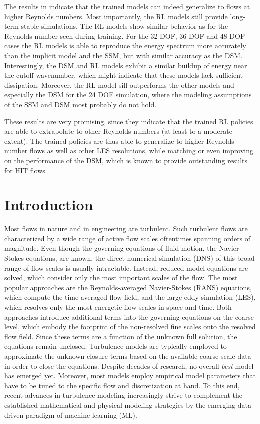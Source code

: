 The results in  indicate that the trained models can indeed generalize to flows at higher Reynolds numbers.
Most importantly, the RL models still provide long-term stable simulations.
The RL models show similar behavior as for the Reynolds number seen during training. 
For the 32 DOF, 36 DOF and 48 DOF cases the RL models is able to reproduce the energy spectrum more accurately than the implicit model and the SSM, but with similar accuracy as the DSM. 
Interestingly, the DSM and RL models exhibit a similar buildup of energy near the cutoff wavenumber, which might indicate that these models lack sufficient dissipation.
Moreover, the RL model sill outperforms the other models and especially the DSM for the 24 DOF simulation, where the modeling assumptions of the SSM and DSM most probably do not hold.

These results are very promising, since they indicate that the trained RL policies are able to extrapolate to other Reynolds numbers (at least to a moderate extent).
The trained policies are thus able to generalize to higher Reynolds number flows as well as other LES resolutions, while matching or even improving on the performance of the DSM, which is known to provide outstanding results for HIT flows.

\section{Introduction}
\label{sec:introduction}


Most flows in nature and in engineering are turbulent.
Such turbulent flows are characterized by a wide range of active flow scales oftentimes spanning orders of magnitude.
Even though the governing equations of fluid motion, the Navier-Stokes equations, are known, the direct numerical simulation (DNS) of this broad range of flow scales is usually intractable.
Instead, reduced model equations are solved, which consider only the most important scales of the flow.
The most popular approaches are the Reynolds-averaged Navier-Stokes (RANS) equations, which compute the time averaged flow field, and the large eddy simulation (LES), which resolves only the most energetic flow scales in space and time.
Both approaches introduce additional terms into the governing equations on the coarse level, which embody the footprint of the non-resolved fine scales onto the resolved flow field.
Since these terms are a function of the unknown full solution, the equations remain unclosed.
Turbulence models are typically employed to approximate the unknown closure terms based on the available coarse scale data in order to close the equations.
Despite decades of research, no overall \textit{best} model has emerged yet.
Moreover, most models employ empirical model parameters that have to be tuned to the specific flow and discretization at hand.
To this end, recent advances in turbulence modeling increasingly strive to complement the established mathematical and physical modeling strategies by the emerging data-driven paradigm of machine learning (ML).

